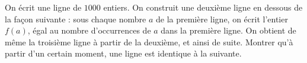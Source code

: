 On écrit une ligne de $1000$ entiers. On construit une deuxième ligne en dessous de la façon suivante : sous chaque nombre $a$ de la première ligne, on écrit l'entier $f(a)$, égal au nombre d'occurrences de $a$ dans la première ligne. On obtient de même la troisième ligne à partir de la deuxième, et ainsi de suite. Montrer qu'à partir d'un certain moment, une ligne est identique à la suivante.
